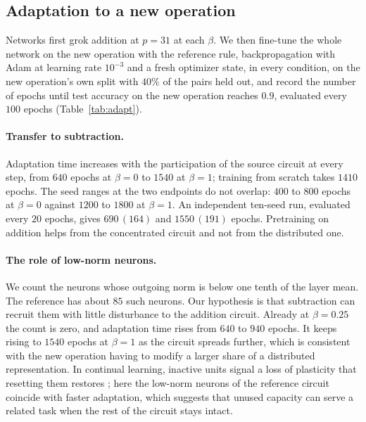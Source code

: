 \documentclass{article} %
\begin{document}
\subsection{Adaptation to a new operation}
\label{app:adapt}
Networks first grok addition at $p = 31$ at each $\beta$. We then fine-tune the whole network on the new operation with the reference rule, backpropagation with Adam at learning rate $10^{-3}$ and a fresh optimizer state, in every condition, on the new operation's own split with $40\%$ of the pairs held out, and record the number of epochs until test accuracy on the new operation reaches $0.9$, evaluated every $100$ epochs (Table~\ref{tab:adapt}).

\paragraph{Transfer to subtraction.} Adaptation time increases with the participation of the source circuit at every step, from $640$ epochs at $\beta = 0$ to $1540$ at $\beta = 1$; training from scratch takes $1410$ epochs. The seed ranges at the two endpoints do not overlap: $400$ to $800$ epochs at $\beta = 0$ against $1200$ to $1800$ at $\beta = 1$. An independent ten-seed run, evaluated every $20$ epochs, gives $690\,(164)$ and $1550\,(191)$ epochs. Pretraining on addition helps from the concentrated circuit and not from the distributed one.

\paragraph{The role of low-norm neurons.} We count the neurons whose outgoing norm is below one tenth of the layer mean. The reference has about $85$ such neurons. Our hypothesis is that subtraction can recruit them with little disturbance to the addition circuit. Already at $\beta = 0.25$ the count is zero, and adaptation time rises from $640$ to $940$ epochs. It keeps rising to $1540$ epochs at $\beta = 1$ as the circuit spreads further, which is consistent with the new operation having to modify a larger share of a distributed representation. In continual learning, inactive units signal a loss of plasticity that resetting them restores \citep{sokar2023dormant,dohare2024loss}; here the low-norm neurons of the reference circuit coincide with faster adaptation, which suggests that unused capacity can serve a related task when the rest of the circuit stays intact.
\end{document}
